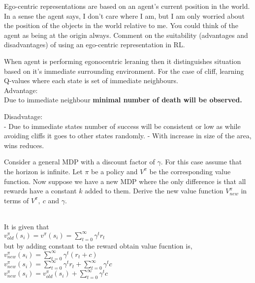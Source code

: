\documentclass[addpoints,12pt,solution]{exam}
\begin{document}
\begin{questions}
\begin{enumerate}[label=(\alph*)]
\begin{solution}
\end{solution}

\end{enumerate}

\question[1]Ego-centric representations are based on an agent's current
position in the world. In a sense the agent says, I don’t care where
I am, but I am only worried about the position of the objects in the
world relative to me. You could think of the agent as being at the origin
always. Comment on the suitability (advantages and disadvantages)
of using an ego-centric representation in RL.

\begin{solution}

When agent is performing egonocentric leraning then it distinguishes situation based on it's immediate surrounding environment. For the case of cliff, learning Q-values where each state is set of immediate neighbours. \cite{ego} \\
Advantage: \\
Due to immediate neighbour \textbf{minimal number of death will be observed.}

Disadvatage:\\
- Due to immediate states number of success will be consistent or low as while avoiding cliffs it goes to other states randomly.
- With increase in size of the area, wins reduces.

\end{solution}

\question[2] Consider a general MDP with a discount factor of $\gamma$.
For this case assume that the horizon is infinite. Let $\pi$ be a policy and $V^{\pi}$ be the corresponding value function. Now suppose we have a new
MDP where the only difference is that all rewards have a constant $k$ added to them. Derive the new value function $V^{\pi}_{new}$ in terms of $V^{\pi},\ c$ and $\gamma$.

\begin{solution}\\
It is given that \\
$v^{\pi}_{old}(s_i) = v^{\pi}(s_i) = \sum_{t=0}^{\infty} \gamma^t r_t $ \\

but by adding constant to the reward obtain value fucntion is,\\

$v^{\pi}_{new}(s_i) = \sum_{t=0}^{\infty} \gamma^t (r_t + c) $ \\
$v^{\pi}_{new}(s_i) = \sum_{t=0}^{\infty} \gamma^t r_t + \sum_{t=0}^{\infty} \gamma^t c$ \\
$v^{\pi}_{new}(s_i) = v^{\pi}_{old}(s_i) + \sum_{t=0}^{\infty} \gamma^t c$ \\
\end{solution}



\end{questions}
\end{document}

